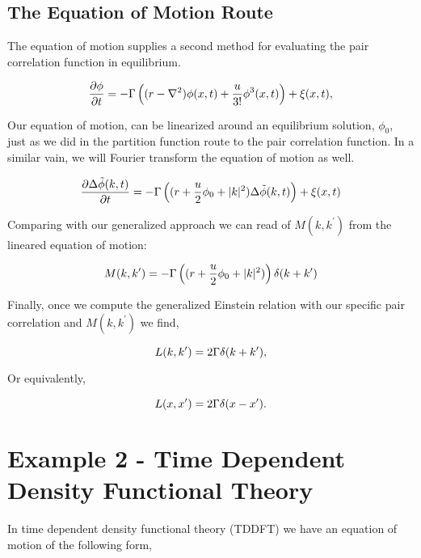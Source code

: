 \subsection{The Equation of Motion Route}

The equation of motion supplies a second method for evaluating the pair correlation function in equilibrium.

\begin{equation}
\frac{\partial \phi}{\partial t} = -\Gamma\left((r-\nabla^2)\phi(x,t) + \frac{u}{3!}\phi^3(x,t)\right) + \xi(x, t),
\end{equation}

Our equation of motion, can be linearized around an equilibrium solution, $\phi_0$, just as we did in the partition function route to the pair correlation function. In a similar vain, we will Fourier transform the equation of motion as well.

\begin{equation}
\frac{\partial \Delta\tilde{\phi}(k, t)}{\partial t} = -\Gamma\left((r + \frac{u}{2}\phi_0 + \vert k \vert^2)\Delta\tilde{\phi}(k,t)\right) + \xi(x,t)
\end{equation}

Comparing with our generalized approach we can read of $M(k, k^\prime)$ from the lineared equation of motion:

\begin{equation}
	M(k, k^\prime) = -\Gamma\left((r + \frac{u}{2}\phi_0 + \vert k \vert^2)\right)\delta(k + k^\prime)
\end{equation}

Finally, once we compute the generalized Einstein relation with our specific pair correlation and $M(k, k^\prime)$ we find,

\begin{equation}
	L(k, k^\prime) = 2\Gamma \delta(k + k^\prime),
\end{equation}

Or equivalently,

\begin{equation}
	L(x, x^\prime) = 2\Gamma \delta(x - x^\prime).
\end{equation}

\section{Example 2 - Time Dependent Density Functional Theory}

In time dependent density functional theory (TDDFT) we have an equation of motion of the following form,

